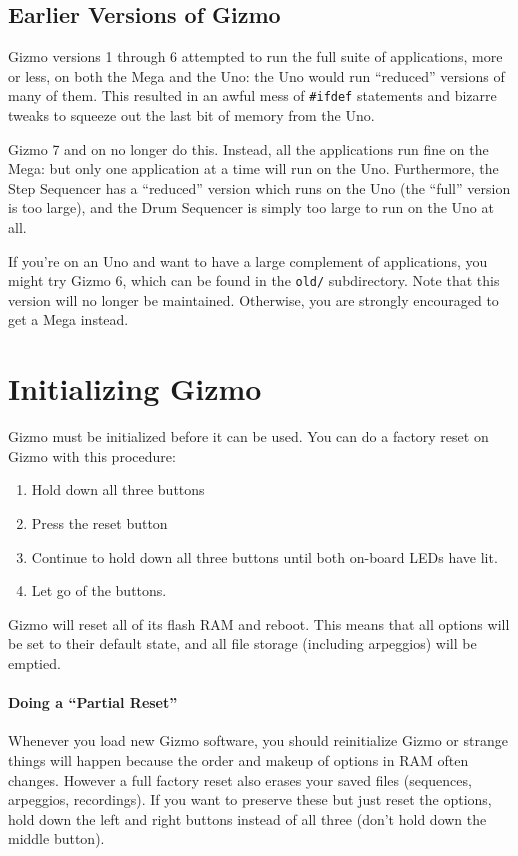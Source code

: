 \documentclass{article}
\begin{document}
\subsection{Earlier Versions of Gizmo}

Gizmo versions 1 through 6 attempted to run the full suite of applications, more or less, on both the Mega and the Uno: the Uno would run ``reduced'' versions of many of them.  This resulted in an awful mess of {\tt \#ifdef} statements and bizarre tweaks to squeeze out the last bit of memory from the Uno.

Gizmo 7 and on no longer do this.  Instead, all the applications run fine on the Mega: but only one application at a time will run on the Uno.  Furthermore, the Step Sequencer has a ``reduced'' version which runs on the Uno (the ``full'' version is too large), and the Drum Sequencer is simply too large to run on the Uno at all.

If you're on an Uno and want to have a large complement of applications, you might try Gizmo 6, which can be found in the {\tt old/} subdirectory.  Note that this version will no longer be maintained.  Otherwise, you are strongly encouraged to get a Mega instead.

\clearpage
\section{Initializing Gizmo}
\label{initializinggizmo}

Gizmo must be initialized before it can be used.  You can do a factory reset on Gizmo with this procedure:

\begin{enumerate}
\item Hold down all three buttons
\item Press the reset button
\item Continue to hold down all three buttons until both on-board LEDs have lit.
\item Let go of the buttons.
\end{enumerate}

Gizmo will reset all of its flash RAM and reboot.  This means that all options will be set to their default state, and all file storage (including arpeggios) will be emptied.

\paragraph{Doing a ``Partial Reset''} Whenever you load new Gizmo software, you should reinitialize Gizmo or strange things will happen because the order and makeup of options in RAM often changes.  However a full factory reset also erases your saved files (sequences, arpeggios, recordings).  If you want to preserve these but just reset the options, hold down the left and right buttons instead of all three (don't hold down the middle button).
\end{document}
